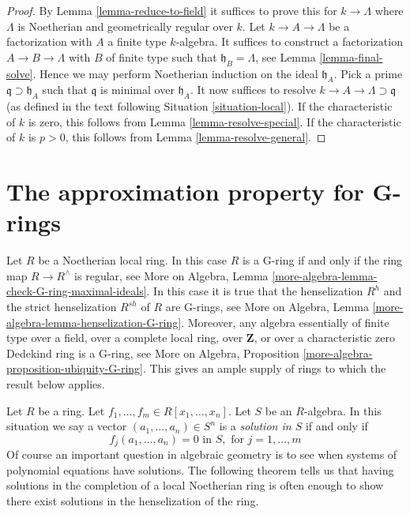 \begin{proof}
By Lemma \ref{lemma-reduce-to-field}
it suffices to prove this for $k \to \Lambda$
where $\Lambda$ is Noetherian and geometrically regular over $k$.
Let $k \to A \to \Lambda$ be a factorization with $A$ a finite type
$k$-algebra. It suffices to construct a factorization
$A \to B \to \Lambda$ with $B$ of finite type such that
$\mathfrak h_B = \Lambda$, see Lemma \ref{lemma-final-solve}.
Hence we may perform Noetherian induction on the ideal $\mathfrak h_A$.
Pick a prime $\mathfrak q \supset \mathfrak h_A$ such that
$\mathfrak q$ is minimal over $\mathfrak h_A$.
It now suffices to resolve $k \to A \to \Lambda \supset \mathfrak q$
(as defined in the text following Situation \ref{situation-local}).
If the characteristic of $k$ is zero, this follows from
Lemma \ref{lemma-resolve-special}.
If the characteristic of $k$ is $p > 0$, this follows from
Lemma \ref{lemma-resolve-general}.
\end{proof}




\section{The approximation property for G-rings}
\label{section-approximation-G-rings}

\noindent
Let $R$ be a Noetherian local ring. In this case $R$ is a G-ring if and
only if the ring map $R \to R^\wedge$ is regular, see
More on Algebra, Lemma \ref{more-algebra-lemma-check-G-ring-maximal-ideals}.
In this case it is true that the henselization $R^h$ and the strict
henselization $R^{sh}$ of $R$ are G-rings, see
More on Algebra, Lemma \ref{more-algebra-lemma-henselization-G-ring}.
Moreover, any algebra essentially of finite type over a field, over a
complete local ring, over $\mathbf{Z}$, or over a characteristic zero
Dedekind ring is a G-ring, see
More on Algebra, Proposition \ref{more-algebra-proposition-ubiquity-G-ring}.
This gives an ample supply of rings to which the result below applies.

\medskip\noindent
Let $R$ be a ring. Let $f_1, \ldots, f_m \in R[x_1, \ldots, x_n]$.
Let $S$ be an $R$-algebra. In this situation we say a vector
$(a_1, \ldots, a_n) \in S^n$ is a {\it solution in $S$}
if and only if
$$
f_j(a_1, \ldots, a_n) = 0 \text{ in } S, \text{ for }
j = 1, \ldots, m
$$
Of course an important question in algebraic geometry is to see when
systems of polynomial equations have solutions. The following theorem
tells us that having solutions in the completion of a local Noetherian
ring is often enough to show there exist solutions in the henselization
of the ring.

